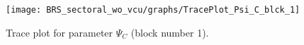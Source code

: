 \begin{figure}[H]
\centering
  \texttt{[image: BRS\_sectoral\_wo\_vcu/graphs/TracePlot\_Psi\_C\_blck\_1]}\\
    \caption{Trace plot for parameter ${\Psi_{C}}$ (block number 1).}
\end{figure}
